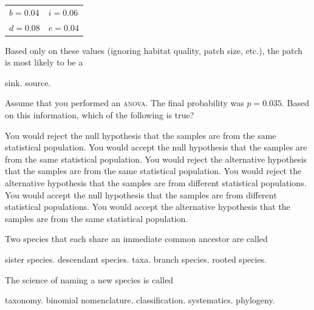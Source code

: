 \qquad\begin{tabular}{@{}ll@{}}
$b = 0.04$ & $i = 0.06$\\
$d = 0.08$ & $e = 0.04$\\
\end{tabular}

Based only on these values (ignoring habitat quality, patch size, etc.), the patch is most likely to be a 

\begin{choices}
\correctchoice  sink.%
\choice  source. %
\end{choices}



\question
Assume that you performed an \textsc{anova}. The final probability was $p = 0.035$. Based on this information, which of the following is true?

\begin{choices}
\correctchoice You would reject the null hypothesis that the samples are from the same statistical population. %
\choice You would accept the null hypothesis that the samples are from the same statistical population. %
\choice You would reject the alternative hypothesis that the samples are from the same statistical population. %
\choice You would reject the alternative hypothesis that the samples are from different statistical populations.
\choice You would accept the null hypothesis that the samples are from different statistical populations. %
\choice You would accept the alternative hypothesis that the samples are from the same statistical population. %
\end{choices}


\question
Two species that each share an immediate common ancestor are called

\begin{choices}
\correctchoice sister species. %
\choice descendant species. %
\choice taxa. %
\choice branch species. %
\choice rooted species. %
\end{choices}

\question
The science of naming a new species is called

\begin{choices}
\correctchoice  taxonomy. %
\choice binomial nomenclature. %
\choice classification. %
\choice systematics. %
\choice phylogeny. %
\end{choices}



